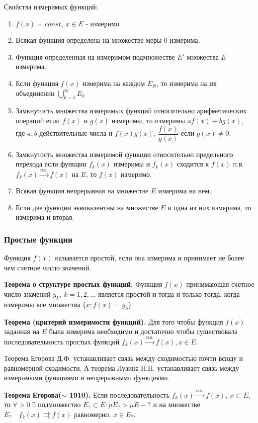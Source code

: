 \documentclass[14pt,a4paper]{extarticle}
\theoremstyle{definition}
\theoremstyle{remark}
\renewcommand{\[}{\begin{dmath*}[compact]}
\renewcommand{\]}{\end{dmath*}}
\newcommand{\be}{\begin{enumerate}}
\newcommand{\ee}{\end{enumerate}}
\newcommand{\sep}{ , \ \allowbreak }
\newcommand\f[2]{\dfrac{#1}{#2}}
\newcommand{\tth}[1][]{\textbf{Теорема#1.}}
\begin{document}
Свойства измеримых функций:

\be
  \item $f(x)=const \sep x \in E$ - измеримо.
  \item Всякая функция определена на множестве меры 0 измерима.
  \item Функция определенная на измеримом подмножестве $E'$ множества $E$ измерима.
  \item Если функция $f(x)$ измерима на каждом $E_R$, то измерима на их объединении $\bigcup _ {k=1}^\infty E_k$
  \item Замкнутость множества измеримых функций относительно арифметических операций если $f(x)$ и $g(x)$ измеримы, то измеримы $af(x)+ bg(x)$, где $a,b$ действительные числа и $f(x)g(x)$, $\f{f(x)}{g(x)}$ если $g(x) \neq 0$.
  \item Замкнутость множества измеримой функции относительно предельного перехода если функции $f_k(x)$ измеримы и $f_k(x)$ сходится к $f(x)$ п.в. $f_k(x) \xrightarrow{п.в.} f(x)$ на $E$, то $f(x)$ измеримо.
  \item Всякая функция непрерывная на множестве $E$ измерима на нем.
  \item Если две функции эквивалентны на множестве $E$ и одна из них измерима, то измерима и вторая.
\ee

\subsubsection{Простые функции}

Функция $f(x)$ называется простой, если она измерима и принимает не более чем счетное число значений.

\tth[ о структуре простых функций] Функция $f(x)$ принимающая счетное число значений $y_k\sep k=1,2,\dots$ является простой и тогда и только тогда, когда измеримы все множества $\{x: f(x) = y_k \}$

\tth[ (критерий измеримости функций)] Для того чтобы функция $f(x)$ заданная на $E$ была измерима необходимо и достаточно чтобы существовала последовательность простых функций $f_k (x) \xrightarrow{\text{п.в.}} f(x), x \in E$.

Теорема Егорова Д.Ф. устанавливает связь между сходимостью почти всюду и равномерной сходимости. А теорема Лузина Н.Н. устанавливает связь между измеримыми функциями и непрерывными функциями.

\tth[ Егорова($\sim$ 1910)] Если последовательность $f_k(x) \xrightarrow{п.в.} f(x) \sep x \subset E$, то $\forall  > 0 \ \exists$ подмножество $ E_? \subset E : \mu E_? > \mu E - ? $ и на множестве $E_? \quad f_k(x) \rightrightarrows f(x)$ равномерно, $x \in E_?$.
\end{document}
